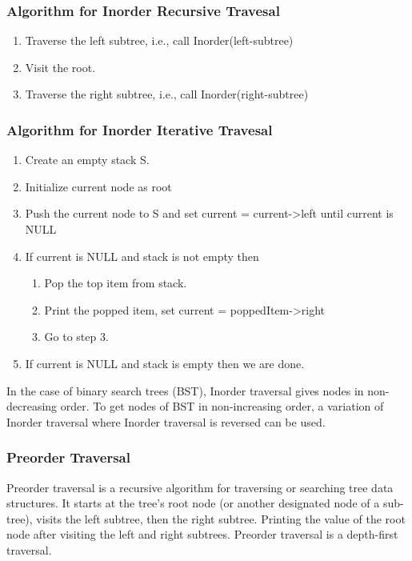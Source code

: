 \documentclass[11pt]{article}
\begin{document}
\subsubsection{Algorithm for Inorder Recursive Travesal}
\begin{enumerate}
    \item Traverse the left subtree, i.e., call Inorder(left-subtree)
    \item Visit the root.
    \item Traverse the right subtree, i.e., call Inorder(right-subtree)

\end{enumerate}
\subsubsection{Algorithm for Inorder Iterative Travesal}

\begin{enumerate}
    \item Create an empty stack S.
    \item Initialize current node as root
    \item Push the current node to S and set current = current->left until current is NULL
    \item If current is NULL and stack is not empty then
    \begin{enumerate}
        \item Pop the top item from stack.
        \item Print the popped item, set current = poppedItem->right
        \item Go to step 3.
    \end{enumerate}
    \item If current is NULL and stack is empty then we are done.
\end{enumerate}

In the case of binary search trees (BST), Inorder traversal gives nodes in non-decreasing order. To get nodes of BST in non-increasing order, a variation of Inorder traversal where Inorder traversal is reversed can be used. 


\subsubsection{Preorder Traversal}
Preorder traversal is a recursive algorithm for traversing or searching tree data structures. It starts at the tree's root node (or another designated node of a sub-tree), visits the left subtree, then the right subtree. Printing the value of the root node after visiting the left and right subtrees. Preorder traversal is a depth-first traversal.
\end{document}
